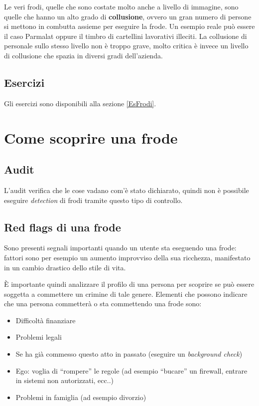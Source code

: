 Le veri frodi, quelle che sono costate molto anche a livello di immagine, sono
quelle che hanno un alto grado di \textbf{collusione}, ovvero un gran numero di
persone si mettono in combutta assieme per eseguire la frode. Un esempio 
reale può essere il caso Parmalat oppure il timbro di cartellini lavorativi 
illeciti. La collusione di personale sullo stesso livello non è troppo grave, 
molto critica è invece un livello di collusione che spazia in diversi gradi 
dell'azienda.

\subsection{Esercizi}

Gli esercizi sono disponibili alla sezione \ref{EsFrodi}.

\section{Come scoprire una frode}

\subsection{Audit}

L'audit verifica che le cose vadano com'è stato dichiarato, quindi non è
possibile eseguire \textit{detection} di frodi tramite questo tipo di controllo.

\subsection{Red flags di una frode}
Sono presenti segnali importanti quando un utente sta eseguendo una frode: 
fattori sono per esempio un aumento improvviso della sua ricchezza, manifestato
in un cambio drastico dello stile di vita.

È importante quindi analizzare il profilo di una persona per scoprire se può
essere soggetta a commettere un crimine di tale genere. Elementi che possono 
indicare che una persona commetterà o sta commettendo una frode sono:
\begin{itemize}
  \item Difficoltà finanziare
  \item Problemi legali
  \item Se ha già commesso questo atto in passato (eseguire un
  \textit{background check})
  \item Ego: voglia di ``rompere'' le regole (ad esempio ``bucare'' un
  firewall, entrare in sistemi non autorizzati, ecc..)
  \item Problemi in famiglia (ad esempio divorzio)
\end{itemize}

